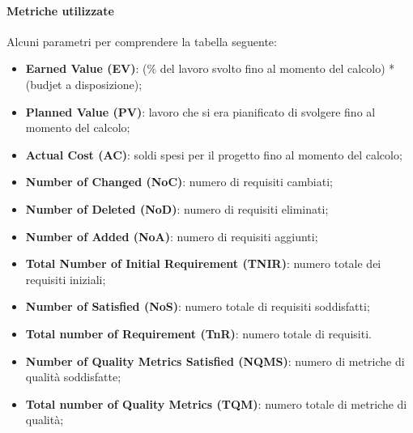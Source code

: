 \paragraph{Metriche utilizzate}
Alcuni parametri per comprendere la tabella seguente:
\begin{itemize}
	\item \textbf{Earned Value (EV)}: (\% del lavoro svolto fino al momento del calcolo) * (budjet a disposizione);
	\item \textbf{Planned Value (PV)}: lavoro che si era pianificato di svolgere fino al momento del calcolo;
	\item \textbf{Actual Cost (AC)}: soldi spesi per il progetto fino al momento del calcolo;
	\item \textbf{Number of Changed (NoC)}: numero di requisiti cambiati;
	\item \textbf{Number of Deleted (NoD)}: numero di requisiti eliminati;
	\item \textbf{Number of Added (NoA)}: numero di requisiti aggiunti;
	\item \textbf{Total Number of Initial Requirement (TNIR)}: numero totale dei requisiti iniziali;
	\item \textbf{Number of Satisfied (NoS)}: numero totale di requisiti soddisfatti;
	\item \textbf{Total number of Requirement (TnR)}: numero totale di requisiti.
	\item \textbf{Number of Quality Metrics Satisfied (NQMS)}: numero di metriche di qualità soddisfatte;
	\item \textbf{Total number of Quality Metrics (TQM)}: numero totale di metriche di qualità;
	
\end{itemize}

